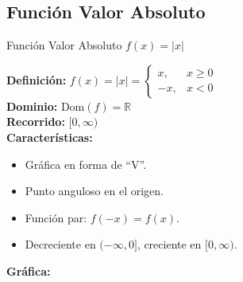 \documentclass[12pt,a4paper]{article}
\newcommand{\Dominio}{\ensuremath{\mathrm{Dom}}}
\begin{document}
\subsection{Función Valor Absoluto}
\begin{funcbox}{Función Valor Absoluto $f(x)=|x|$}
\begin{minipage}[t]{0.55\textwidth}
    \textbf{Definición:} $f(x)=|x|=\begin{cases} 
                x, & x\geq 0 \\
                -x, & x<0 
            \end{cases}$\\
    \textbf{Dominio:} $\Dominio(f)=\mathbb{R}$\\
    \textbf{Recorrido:} $[0,\infty)$\\
    \textbf{Características:}
    \begin{itemize}
        \item Gráfica en forma de ``V''.
        \item Punto anguloso en el origen.
        \item Función par: $f(-x)=f(x)$.
        \item Decreciente en $(-\infty,0]$, creciente en $[0,\infty)$.
    \end{itemize}
    \textbf{Gráfica:}
\end{minipage}\hfill
\begin{minipage}[t]{0.4\textwidth}
    \centering
\end{minipage}
\end{funcbox}

\end{document}

